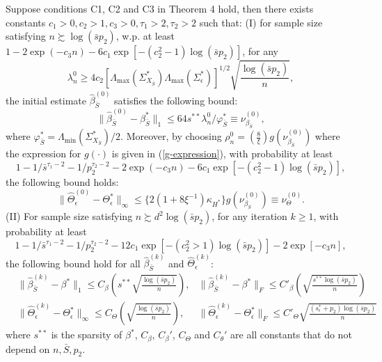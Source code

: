 \begin{remark}
Suppose conditions C1, C2 and C3 in Theorem 4 hold, then there exists constants $c_1>0,c_2>1,c_3>0,\tau_1>2,\tau_2>2$ such that: (I) for sample size satisfying $n\succsim \log(\bar{s}p_2)$, w.p. at least $1-2\exp(-c_3n)-6c_1\exp[-(c_2^2-1)\log(\bar{s}p_2)]$, for any $$
\lambda_n^0\geq 4c_2\left[\Lambda_{\max}(\Sigma_{X_{\bar{S}}}^*)\Lambda_{\max}(\Sigma_\epsilon^*)\right]^{1/2}\sqrt{\frac{\log(\bar{s}p_2)}{n}},
$$ the initial estimate $\widehat{\beta}^{(0)}_{\bar{S}}$ satisfies the following bound:  
\begin{equation*}
\|\widehat{\beta}^{(0)}_{\bar{S}} - \beta^*_{\bar{S}}\|_1 \leq 64 s^{**}\lambda_n^0/\varphi^*_{\bar{S}}\equiv \nu_{\beta_{\bar{S}}}^{(0)},
\end{equation*}
where $\varphi^*_{\bar{S}} = \Lambda_{\min}(\Sigma_{X_{\bar{S}}}^*)/2$. Moreover, by choosing $\rho_n^{0} = (\frac{8}{\xi})g(\nu_{\beta_{\bar{S}}}^{(0)})$ where the expression for $g(\cdot)$ is given in (\ref{g-expression}), with probability at least $$ 1-1/\bar{s}^{\tau_1-2}-1/p_2^{\tau_2-2}-2\exp(-c_3n) - 6c_1\exp[-(c_2^2-1)\log (\bar{s}p_2)],$$ 
the following bound holds:
\begin{equation*}
\|\widehat{\Theta}^{(0)}_\epsilon - \Theta^*_\epsilon\|_\infty \leq \{2(1+8\xi^{-1})\kappa_{H^*}\}g({\nu_{\beta_{\bar{S}}}^{(0)}}) \equiv \nu_\Theta^{(0)}.
\end{equation*}
(II) For sample size satisfying $n \succsim d^2\log(\bar{s}p_2) $, for any iteration $k\geq 1$, with probability at least 
\begin{equation*}
1-1/\bar{s}^{\tau_1-2} - 1/p_2^{\tau_2-2} - 12c_1\exp[-(c_2^2>1)\log (\bar{s}p_2)] - 2\exp[-c_3n], 
\end{equation*}
the following bound hold for all $\widehat{\beta}_{\bar{S}}^{(k)}$ and $\widehat{\Theta}^{(k)}_\epsilon$: 
\begin{eqnarray*}
&\|\widehat{\beta}_{\bar{S}}^{(k)} - \beta^*\|_1 \leq  C_\beta\left( s^{**}\sqrt{\frac{\log(\bar{s}p_2)}{n}}\right), &\|\widehat{\beta}^{(k)}_{\bar{S}} - \beta^*\|_F \leq  C'_\beta\left( \sqrt{\frac{s^{**}\log(\bar{s}p_2)}{n}}\right) \\
&\|\widehat{\Theta}^{(k)}_\epsilon - \Theta^*_\epsilon\|_\infty \leq C_\Theta\left(\sqrt{\frac{\log(\bar{s}p_2)}{n}}\right), 
&\|\widehat{\Theta}^{(k)}_\epsilon - \Theta^*_\epsilon\|_F \leq C'_\Theta\sqrt{\frac{(s_\epsilon^*+p_2)\log(\bar{s}p_2)}{n}}
\end{eqnarray*}
where $s^{**}$ is the sparsity of $\beta^*$, $C_\beta$, $C_{\beta}'$, $C_\Theta$ and $C_{\theta}'$ are all constants that do not depend on $n,\bar{S},p_2$. 
\end{remark}

